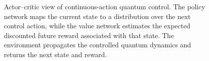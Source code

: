 \begin{figure}[htpb]


\caption{Actor--critic view of continuous-action quantum control. The policy network maps the current state to a distribution over the next control action, while the value network estimates the expected discounted future reward associated with that state. The environment propagates the controlled quantum dynamics and returns the next state and reward.}
\label{fig:actor_critic_nn_control}
\end{figure}
